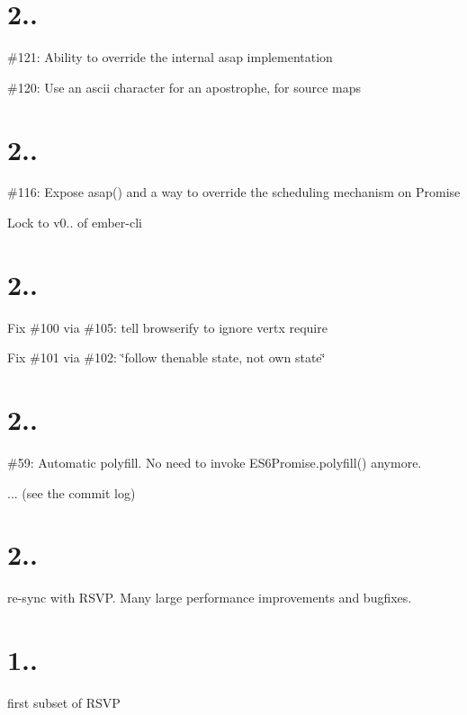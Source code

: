 \section*{2..}


\begin{DoxyItemize}
\item \#121\+: Ability to override the internal asap implementation
\item \#120\+: Use an ascii character for an apostrophe, for source maps
\end{DoxyItemize}

\section*{2..}


\begin{DoxyItemize}
\item \#116\+: Expose asap() and a way to override the scheduling mechanism on Promise
\item Lock to v0.. of ember-\/cli
\end{DoxyItemize}

\section*{2..}


\begin{DoxyItemize}
\item Fix \#100 via \#105\+: tell browserify to ignore vertx require
\item Fix \#101 via \#102\+: \char`\"{}follow thenable state, not own state\char`\"{}
\end{DoxyItemize}

\section*{2..}


\begin{DoxyItemize}
\item \#59\+: Automatic polyfill. No need to invoke {\ttfamily E\+S6\+Promise.\+polyfill()} anymore.
\item ... (see the commit log)
\end{DoxyItemize}

\section*{2..}


\begin{DoxyItemize}
\item re-\/sync with R\+S\+VP. Many large performance improvements and bugfixes.
\end{DoxyItemize}

\section*{1..}


\begin{DoxyItemize}
\item first subset of R\+S\+VP 
\end{DoxyItemize}
